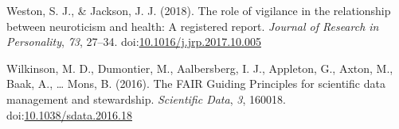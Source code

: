\documentclass[,jou, a4paper,floatsintext]{apa6}
\begin{document}
\leavevmode\hypertarget{ref-weston_role_2018}{}%
Weston, S. J., \& Jackson, J. J. (2018). The role of vigilance in the relationship between neuroticism and health: A registered report. \emph{Journal of Research in Personality}, \emph{73}, 27--34. doi:\href{https://doi.org/10.1016/j.jrp.2017.10.005}{10.1016/j.jrp.2017.10.005}

\leavevmode\hypertarget{ref-wilkinson_fair_2016}{}%
Wilkinson, M. D., Dumontier, M., Aalbersberg, I. J., Appleton, G., Axton, M., Baak, A., \ldots{} Mons, B. (2016). The FAIR Guiding Principles for scientific data management and stewardship. \emph{Scientific Data}, \emph{3}, 160018. doi:\href{https://doi.org/10.1038/sdata.2016.18}{10.1038/sdata.2016.18}
\end{document}
